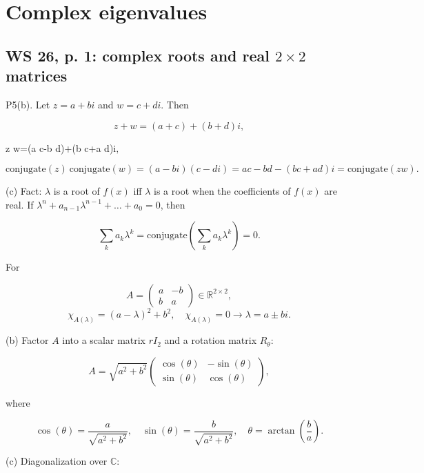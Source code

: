 \chapter{Complex eigenvalues}

\section{\texorpdfstring{WS 26, p. 1: complex roots and real \(2 \times 2\) matrices}{WS 26, p. 1: complex roots and real 2 \textbackslash times 2 matrices}}

P5(b). Let \(z = a + bi\) and \(w = c + di\). Then

\[z + w = \left( {a + c} \right) + \left( {b + d} \right)i,\]

z w=(a c-b d)+(b c+a d)i\(,\)

\[\text{conjugate}(z)\ \text{conjugate}(w) = \left( {a - bi} \right)\left( {c - di} \right) = ac - bd - \left( {bc + ad} \right)i = \text{conjugate}\left( {zw} \right).\]

(c) Fact: \(\lambda\) is a root of \(f(x)\) iff \(\lambda\) is a root when the coefficients of \(f(x)\) are real. If \(\lambda^{n} + a_{n - 1}\lambda^{n - 1} + \ldots + a_{0} = 0\), then

\[\sum\limits_{k}a_{k}\lambda^{k} = \text{conjugate}\left( {\sum\limits_{k}a_{k}\lambda^{k}} \right) = 0.\]

For

\[A = \begin{pmatrix}
a & {- b} \\
b & a
\end{pmatrix} \in \mathbb{R}^{2 \times 2},\]\[\chi_{A{(\lambda)}} = \left( {a - \lambda} \right)^{2} + b^{2},\quad\chi_{A{(\lambda)}} = 0\rightarrow\lambda = a \pm bi.\]

(b) Factor \(A\) into a scalar matrix \(rI_{2}\) and a rotation matrix \(R_{\theta}\):

\[A = \sqrt{a^{2} + b^{2}}\begin{pmatrix}
{\cos(\theta)} & {- \sin(\theta)} \\
{\sin(\theta)} & {\cos(\theta)}
\end{pmatrix},\]

where

\[\cos(\theta) = \frac{a}{\sqrt{a^{2} + b^{2}}},\quad\sin(\theta) = \frac{b}{\sqrt{a^{2} + b^{2}}},\quad\theta = \arctan\left( \frac{b}{a} \right).\]

(c) Diagonalization over \(\mathbb{C}\):

